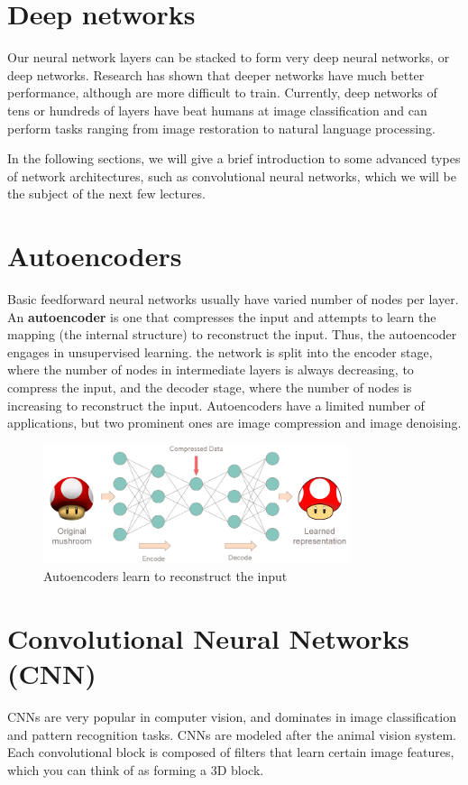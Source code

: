 \documentclass{article}
\begin{document}
\section{Deep networks}
Our neural network layers can be stacked to form very deep neural networks, or deep networks. Research has shown that deeper networks have much better performance, although are more difficult to train. Currently, deep networks of tens or hundreds of layers have beat humans at image classification and can perform tasks ranging from image restoration to natural language processing.

In the following sections, we will give a brief introduction to some advanced types of network architectures, such as convolutional neural networks, which we will be the subject of the next few lectures.

\section{Autoencoders}
Basic feedforward neural networks usually have varied number of nodes per layer. An \textbf{autoencoder} is one that compresses the input and attempts to learn the mapping (the internal structure) to reconstruct the input. Thus, the autoencoder engages in unsupervised learning. the network is split into the encoder stage, where the number of nodes in intermediate layers is always decreasing, to compress the input, and the decoder stage, where the number of nodes is increasing to reconstruct the input. Autoencoders have a limited number of applications, but two prominent ones are image compression and image denoising. 

\begin{figure}[H]
    \begin{center}
        \includegraphics[width=0.8\textwidth]{auto.jpg}
    \end{center}
    \vspace{-10pt}
    \caption{Autoencoders learn to reconstruct the input}
\end{figure}

\section{Convolutional Neural Networks (CNN)}
CNNs are very popular in computer vision, and dominates in image classification and pattern recognition tasks. CNNs are modeled after the animal vision system. Each convolutional block is composed of filters that learn certain image features, which you can think of as forming a 3D block. 
\end{document}
